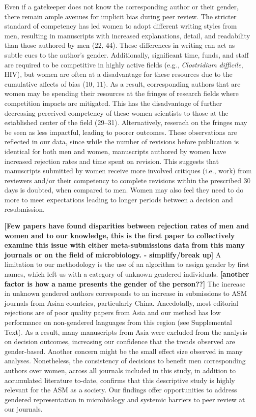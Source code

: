 \documentclass[11pt,]{article}
\begin{document}
Even if a gatekeeper does not know the corresponding author or their
gender, there remain ample avenues for implicit bias during peer review.
The stricter standard of competency has led women to adopt different
writing styles from men, resulting in manuscripts with increased
explanations, detail, and readability than those authored by men (22,
44). These differences in writing can act as subtle cues to the author's
gender. Additionally, significant time, funds, and staff are required to
be competitive in highly active fields (e.g., \emph{Clostridium
difficile}, HIV), but women are often at a disadvantage for these
resources due to the cumulative affects of bias (10, 11). As a result,
corresponding authors that are women may be spending their resources at
the fringes of research fields where competition impacts are mitigated.
This has the disadvantage of further decreasing perceived competency of
these women scientists to those at the established center of the field
(29--31). Alternatively, reserach on the fringes may be seen as less
impactful, leading to poorer outcomes. These observations are reflected
in our data, since while the number of revisions before publication is
identical for both men and women, manuscripts authored by women have
increased rejection rates and time spent on revision. This suggests that
manuscripts submitted by women receive more involved critiques (i.e.,
work) from reviewers and/or their competency to complete revisions
within the prescribed 30 days is doubted, when compared to men. Women
may also feel they need to do more to meet expectations leading to
longer periods between a decision and resubmission.

\textbf{{[}Few papers have found disparities between rejection rates of
men and women and to our knowledge, this is the first paper to
collectively examine this issue with either meta-submissions data from
this many journals or on the field of microbiology. - simplify/break
up{]}} A limitation to our methodology is the use of an algorithm to
assign gender by first names, which left us with a category of unknown
gendered individuals. \textbf{{[}another factor is how a name presents
the gender of the person??{]}} The increase in unknown gendered authors
corresponds to an increase in submissions to ASM journals from Asian
countries, particularly China. Anecdotally, most editorial rejections
are of poor quality papers from Asia and our method has low performance
on non-gendered languages from this region (see Supplemental Text). As a
result, many manuscripts from Asia were excluded from the analysis on
decision outcomes, increasing our confidence that the trends observed
are gender-based. Another concern might be the small effect size
observed in many analyses. Nonetheless, the consistency of decisions to
benefit men corresponding authors over women, across all journals
included in this study, in addition to accumulated literature to-date,
confirms that this descriptive study is highly relevant for the ASM as a
society. Our findings offer opportunities to address gendered
representation in microbiology and systemic barriers to peer review at
our journals.
\end{document}
